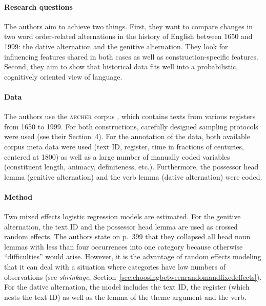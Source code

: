 \begin{svgraybox}
  \textbf{\citet{WolkEa2013}}
  
  \vspace{-\baselineskip}\paragraph{Research questions}\vspace{-0.5\baselineskip}

  The authors aim to achieve two things.
  First, they want to compare changes in two word order-related alternations in the history of English between 1650 and 1999: the dative alternation and the genitive alternation.
  They look for influencing features shared in both cases as well as construction-specific features.
  Second, they aim to show that historical data fits well into a probabilistic, cognitively oriented view of language.

  \vspace{-\baselineskip}\paragraph{Data}\vspace{-0.5\baselineskip}

  The authors use the \textsc{archer} corpus \citep{BiberEa1994}, which contains texts from various registers from 1650 to 1999.
  For both constructions, carefully designed sampling protocols were used (see their Section~4).
  For the annotation of the data, both available corpus meta data were used (text ID, register, time in fractions of centuries, centered at 1800) as well as a large number of manually coded variables (constituent length, animacy, definiteness, etc.).
  Furthermore, the possessor head lemma (genitive alternation) and the verb lemma (dative alternation) were coded.

  \vspace{-\baselineskip}\paragraph{Method}\vspace{-0.5\baselineskip}

  Two mixed effects logistic regression models are estimated.
  For the genitive alternation, the text ID and the possessor head lemma are used as crossed random effects.
  The authors state on p.~399 that they collapsed all head noun lemmas with less than four occurrences into one category because otherwise ``difficulties'' would arise.
  However, it is the advantage of random effects modeling that it can deal with a situation where categories have low numbers of observations (see \textit{shrinkage}, Section~\ref{sec:choosingbetweenrandomandfixedeffects}).
  For the dative alternation, the model includes the text ID, the register (which nests the text ID) as well as the lemma of the theme argument and the verb. 


\end{svgraybox}
